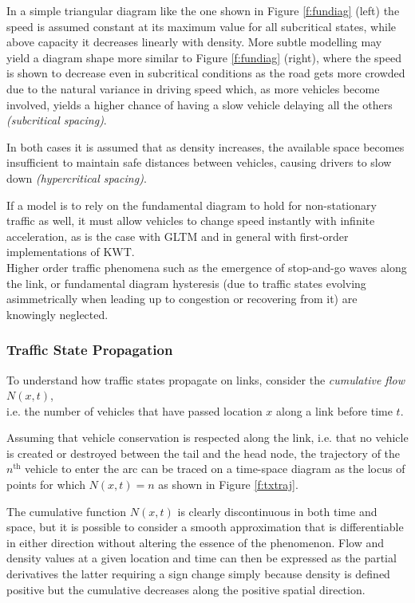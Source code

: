 In a simple triangular diagram like the one shown in Figure \ref{f:fundiag} (left) the speed is assumed constant at its maximum value for all subcritical states, while above capacity it decreases linearly with density. More subtle modelling may yield a diagram shape more similar to Figure \ref{f:fundiag} (right), where the speed is shown to decrease even in subcritical conditions as the road gets more crowded due to the natural variance in driving speed which, as more vehicles become involved, yields a higher chance of having a slow vehicle delaying all the others \emph{(subcritical spacing)}.

In both cases it is assumed that as density increases, the available space becomes insufficient to maintain safe distances between vehicles, causing drivers to slow down \emph{(hypercritical spacing)}.

If a model is to rely on the fundamental diagram to hold for non-stationary traffic as well, it must allow vehicles to change speed instantly with infinite acceleration, as is the case with GLTM and in general with first-order implementations of KWT. \\
Higher order traffic phenomena such as the emergence of stop-and-go waves along the link, or fundamental diagram hysteresis (due to traffic states evolving asimmetrically when leading up to congestion or recovering from it) are knowingly neglected.

\subsubsection{Traffic State Propagation}
To understand how traffic states propagate on links, consider the \emph{cumulative flow} $N(x,t)$, \\ i.e. the number of vehicles that have passed location $x$ along a link before time $t$.

Assuming that vehicle conservation is respected along the link, i.e. that no vehicle is created or destroyed between the tail and the head node, the trajectory of the $n^{\mathrm{th}}$ vehicle to enter the arc can be traced on a time-space diagram as the locus of points for which $N(x,t) = n$ as shown in Figure \ref{f:txtraj}.


The cumulative function $N(x,t)$ is clearly discontinuous in both time and space, but it is possible to consider a smooth approximation that is differentiable in either direction without altering the essence of the phenomenon. Flow and density values at a given location and time can then be expressed as the partial derivatives
the latter requiring a sign change simply because density is defined positive but the cumulative decreases along the positive spatial direction.

